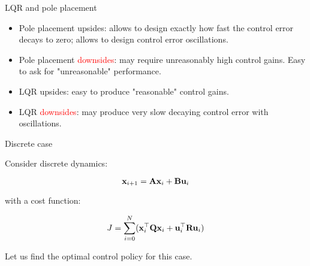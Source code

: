 \documentclass{beamer}
\begin{document}
\begin{frame}{LQR and pole placement}
	\begin{flushleft}
		
		\begin{itemize}
			\item Pole placement \textcolor{mydarkgreen}{upsides}: allows to design exactly how fast the control error decays to zero; allows to design control error oscillations.
			
			\item Pole placement \textcolor{red}{downsides}: may require unreasonably high control gains. Easy to ask for "unreasonable" performance.
			
			\item LQR \textcolor{mydarkgreen}{upsides}: easy to produce "reasonable" control gains.
			
			\item LQR \textcolor{red}{downsides}: may produce very slow decaying control error with oscillations.
		\end{itemize}
		
		
	\end{flushleft}
\end{frame}




\begin{frame}{Discrete case}
	\begin{flushleft}
		
		Consider discrete dynamics:
		
		\begin{equation}
			\mathbf{x}_{i+1} = \mathbf{A}\mathbf{x}_i + \mathbf{B}\mathbf{u}_i
		\end{equation}
		
		with a cost function:
		
		\begin{equation}
			J = \sum_{i=0}^N (\mathbf{x}_i^\top \mathbf{Q} \mathbf{x}_i +  \mathbf{u}_i^\top \mathbf{R} \mathbf{u}_i)
		\end{equation}
		
		Let us find the optimal control policy for this case.
		
		
	\end{flushleft}
\end{frame}
\end{document}
